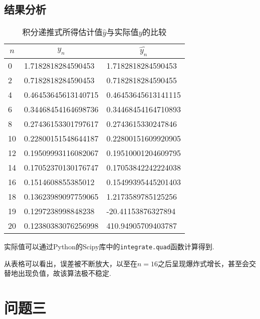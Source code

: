\documentclass[UTF8,ctexart,a4paper,11pt,openany]{article}
\theoremstyle{definition}
\begin{document}
    \subsection{结果分析}
    \begin{table}[H]
        \centering
        \begin{tabular}{lll}
            \toprule
            \multicolumn{1}{c}{$n$} & \multicolumn{1}{c}{$y_n$} & \multicolumn{1}{c}{$\hat{y_n}$} \\ \midrule
            0                     & 1.7182818284590453    & 1.7182818284590453    \\
            2                     & 0.7182818284590453    & 0.7182818284590455    \\
            4                     & 0.46453645613140715   & 0.46453645613141115   \\
            6                     & 0.34468454164698736   & 0.34468454164710893   \\
            8                     & 0.27436153301797617   & 0.2743615330247846    \\
            10                    & 0.22800151548644187   & 0.22800151609920905   \\
            12                    & 0.19509993116082067   & 0.19510001204609795   \\
            14                    & 0.17052370130176747   & 0.17053842242224038   \\
            16                    & 0.1514608855385012    & 0.15499395445201403   \\
            18                    & 0.13623989097759065   & 1.2173589785125256    \\
            19                    & 0.1297238998848238    & -20.41153876327894    \\
            20                    & 0.12380383076256998   & 410.94905709403787    \\ \bottomrule
        \end{tabular}
        \caption{积分递推式所得估计值$\hat{y}$与实际值$y$的比较}
        \label{tab:my-table}
    \end{table}
    实际值可以通过Python的Scipy库中的\texttt{integrate.quad}函数计算得到. \par
    从表格可以看出，误差被不断放大，以至在$n=16$之后呈现爆炸式增长，甚至会交替地出现负值，故该算法极不稳定. \par
\section{问题三}
\end{document}
